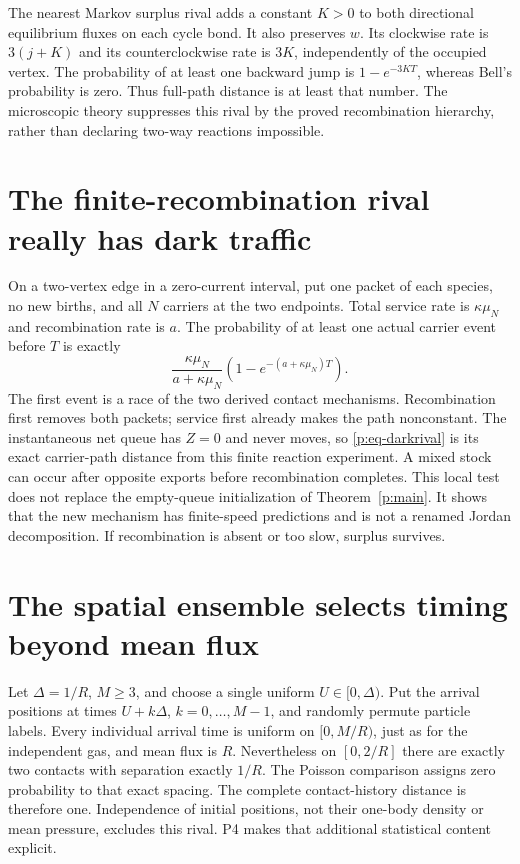 \documentclass[11pt,oneside,openany]{book}
\theoremstyle{definition}
\theoremstyle{remark}\newtheorem{remark}[theorem]{Remark}
\begin{document}
The nearest Markov surplus rival adds a constant $K>0$ to both directional equilibrium fluxes on each cycle bond. It also preserves $w$. Its clockwise rate is $3(j+K)$ and its counterclockwise rate is $3K$, independently of the occupied vertex. The probability of at least one backward jump is $1-e^{-3KT}$, whereas Bell's probability is zero. Thus full-path distance is at least that number. The microscopic theory suppresses this rival by the proved recombination hierarchy, rather than declaring two-way reactions impossible.

\section{The finite-recombination rival really has dark traffic}
On a two-vertex edge in a zero-current interval, put one packet of each species, no new births, and all $N$ carriers at the two endpoints. Total service rate is $\kappa\mu_N$ and recombination rate is $a$. The probability of at least one actual carrier event before $T$ is exactly
\begin{equation}
 \frac{\kappa\mu_N}{a+\kappa\mu_N}
       \left(1-e^{-(a+\kappa\mu_N)T}\right).
 \label{p:eq-darkrival}
\end{equation}
The first event is a race of the two derived contact mechanisms. Recombination first removes both packets; service first already makes the path nonconstant. The instantaneous net queue has $Z=0$ and never moves, so \eqref{p:eq-darkrival} is its exact carrier-path distance from this finite reaction experiment. A mixed stock can occur after opposite exports before recombination completes. This local test does not replace the empty-queue initialization of Theorem~\ref{p:main}. It shows that the new mechanism has finite-speed predictions and is not a renamed Jordan decomposition. If recombination is absent or too slow, surplus survives.

\section{The spatial ensemble selects timing beyond mean flux}
Let $\Delta=1/R$, $M\ge3$, and choose a single uniform $U\in[0,\Delta)$. Put the arrival positions at times $U+k\Delta$, $k=0,\ldots,M-1$, and randomly permute particle labels. Every individual arrival time is uniform on $[0,M/R)$, just as for the independent gas, and mean flux is $R$. Nevertheless on $[0,2/R]$ there are exactly two contacts with separation exactly $1/R$. The Poisson comparison assigns zero probability to that exact spacing. The complete contact-history distance is therefore one. Independence of initial positions, not their one-body density or mean pressure, excludes this rival. P4 makes that additional statistical content explicit.
\end{document}
